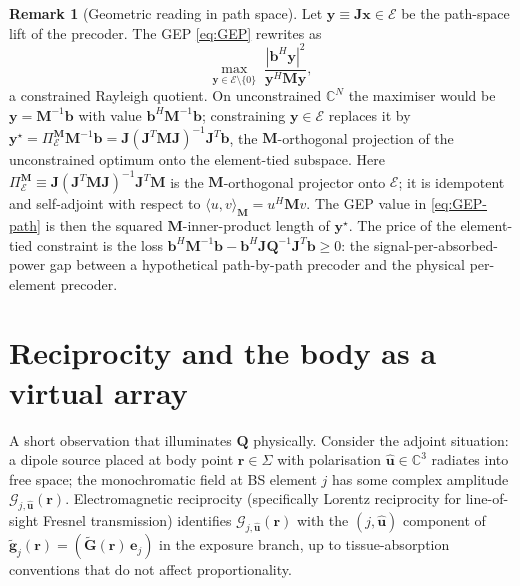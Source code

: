 \documentclass[11pt,a4paper]{article}
\theoremstyle{definition}
\newtheorem{remark}[remark]{Remark}
\newcommand{\rr}{\mathbf{r}}
\newcommand{\Complex}{\mathbb{C}}
\newcommand{\Jmat}{\mathbf{J}}                 %
\newcommand{\Mmat}{\mathbf{M}}                 %
\newcommand{\Qmat}{\mathbf{Q}}                 %
\newcommand{\xx}{\mathbf{x}}
\newcommand{\bvec}{\mathbf{b}}
\newcommand{\Gtil}{\tilde{\mathbf{G}}}
\newcommand{\Sigmabody}{\Sigma}
\begin{document}
\begin{remark}[Geometric reading in path space]\label{rem:oblique}
Let $\mathbf y\equiv\Jmat\xx\in\mathcal E$ be the path-space lift of the
precoder.  The GEP \eqref{eq:GEP} rewrites as
\begin{equation}\label{eq:GEP-y}
  \max_{\mathbf y\in\mathcal E\setminus\{0\}}\;
  \frac{|\bvec^H\mathbf y|^2}{\mathbf y^H\Mmat\mathbf y},
\end{equation}
a constrained Rayleigh quotient.  On unconstrained $\Complex^N$ the
maximiser would be $\mathbf y=\Mmat^{-1}\bvec$ with value
$\bvec^H\Mmat^{-1}\bvec$; constraining $\mathbf y\in\mathcal E$ replaces
it by $\mathbf y^\star=\Pi_\mathcal E^{\Mmat}\Mmat^{-1}\bvec
=\Jmat(\Jmat^T\Mmat\Jmat)^{-1}\Jmat^T\bvec$, the $\Mmat$-orthogonal
projection of the unconstrained optimum onto the element-tied subspace.
Here $\Pi_\mathcal E^{\Mmat}\equiv\Jmat(\Jmat^T\Mmat\Jmat)^{-1}\Jmat^T\Mmat$
is the $\Mmat$-orthogonal projector onto $\mathcal E$; it is idempotent
and self-adjoint with respect to $\langle u,v\rangle_{\Mmat}=u^H\Mmat v$.
The GEP value in \eqref{eq:GEP-path} is then the squared
$\Mmat$-inner-product length of $\mathbf y^\star$.  The price of the
element-tied constraint is the loss
$\bvec^H\Mmat^{-1}\bvec-\bvec^H\Jmat\Qmat^{-1}\Jmat^T\bvec\ge 0$: the
signal-per-absorbed-power gap between a hypothetical
path-by-path precoder and the physical per-element precoder.
\end{remark}

\section{Reciprocity and the body as a virtual array}\label{sec:reciprocity}

A short observation that illuminates $\Qmat$ physically.  Consider the
adjoint situation: a dipole source placed at body point $\rr\in\Sigmabody$
with polarisation $\hat{\mathbf u}\in\Complex^3$ radiates into free
space; the monochromatic field at BS element $j$ has some complex
amplitude $\mathcal G_{j,\hat{\mathbf u}}(\rr)$.  Electromagnetic
reciprocity (specifically Lorentz reciprocity for line-of-sight Fresnel
transmission) identifies $\mathcal G_{j,\hat{\mathbf u}}(\rr)$ with the
$(j,\hat{\mathbf u})$ component of
$\tilde{\mathbf g}_j(\rr)=(\Gtil(\rr)\,\mathbf e_j)$ in the exposure
branch, up to tissue-absorption conventions that do not affect
proportionality.
\end{document}
